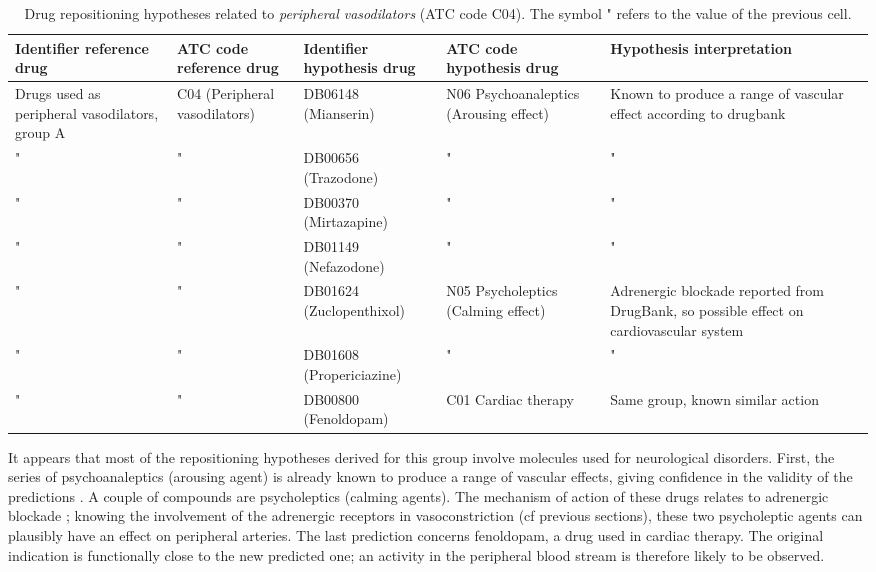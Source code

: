\begin{table}[htbp]
\scriptsize
\begin{tabular}{|p{2cm}|p{2cm}|p{2cm}|p{3cm}|p{4cm}|}
\hline
\textbf{Identifier reference drug} & \textbf{ATC code reference drug} & \textbf{Identifier hypothesis drug} & \textbf{ATC code hypothesis drug} & \textbf{Hypothesis interpretation} \\ \hline
Drugs used as peripheral vasodilators, group A & C04 (Peripheral vasodilators) & DB06148 (Mianserin) & N06 Psychoanaleptics (Arousing effect) & Known to produce a range of vascular effect according to drugbank \\ \hline
" & " & DB00656 (Trazodone) & " & " \\ \hline
" & " & DB00370 (Mirtazapine) & " & " \\ \hline
" & " & DB01149 (Nefazodone) & " & " \\ \hline
" & " & DB01624 (Zuclopenthixol) & N05 Psycholeptics (Calming effect) & Adrenergic blockade reported from DrugBank, so possible effect on cardiovascular system \\ \hline
" & " & DB01608 (Propericiazine) & " & " \\ \hline
" & " & DB00800 (Fenoldopam) & C01 Cardiac therapy & Same group, known similar action \\ \hline
\end{tabular}
\caption{Drug repositioning hypotheses related to \emph{peripheral vasodilators} (ATC code C04). The symbol " refers to the value of the previous cell.}
\label{table:tablec04}
\end{table}

It appears that most of the repositioning hypotheses derived for this group involve molecules used for neurological disorders. First, the series of psychoanaleptics (arousing agent) is already known to produce a range of vascular effects, giving confidence in the validity of the predictions \citep{khalifa2003zuclopenthixol}. A couple of compounds are psycholeptics (calming agents). The mechanism of action of these drugs relates to adrenergic blockade \citep{khalifa2003zuclopenthixol}; knowing the involvement of the adrenergic receptors in vasoconstriction (cf previous sections), these two psycholeptic agents can plausibly have an effect on peripheral arteries. The last prediction concerns fenoldopam, a drug used in cardiac therapy. The original indication is functionally close to the new predicted one; an activity in the peripheral blood stream is therefore likely to be observed.

